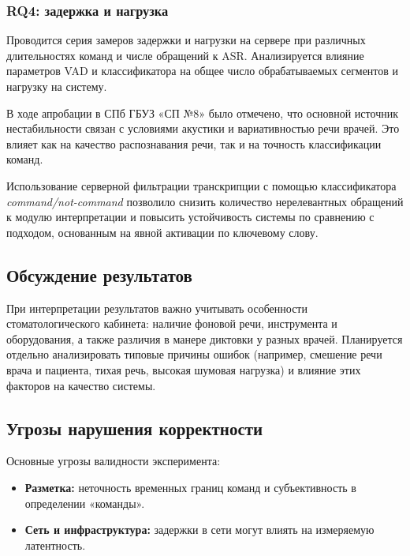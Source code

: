 \subsubsection{RQ4: задержка и нагрузка}
Проводится серия замеров задержки и нагрузки на сервере при различных длительностях команд и числе обращений к ASR.
Анализируется влияние параметров VAD и классификатора на общее число обрабатываемых сегментов и нагрузку на систему.

В ходе апробации в СПб ГБУЗ «СП №8» было отмечено, что основной источник нестабильности связан с условиями акустики и вариативностью речи врачей.
Это влияет как на качество распознавания речи, так и на точность классификации команд.

Использование серверной фильтрации транскрипции с помощью классификатора \textit{command/not-command} позволило снизить количество нерелевантных обращений к модулю интерпретации и повысить устойчивость системы по сравнению с подходом, основанным на явной активации по ключевому слову.

\subsection{Обсуждение результатов}
\label{subsec:exp_discussion}

При интерпретации результатов важно учитывать особенности стоматологического кабинета: наличие фоновой речи, инструмента и оборудования, а также различия в манере диктовки у разных врачей.
Планируется отдельно анализировать типовые причины ошибок (например, смешение речи врача и пациента, тихая речь, высокая шумовая нагрузка) и влияние этих факторов на качество системы.

\subsection{Угрозы нарушения корректности}
\label{subsec:exp_threats}

Основные угрозы валидности эксперимента:
\begin{itemize}
    \item \textbf{Разметка:} неточность временных границ команд и субъективность в определении «команды».
    \item \textbf{Сеть и инфраструктура:} задержки в сети могут влиять на измеряемую латентность.
\end{itemize}
